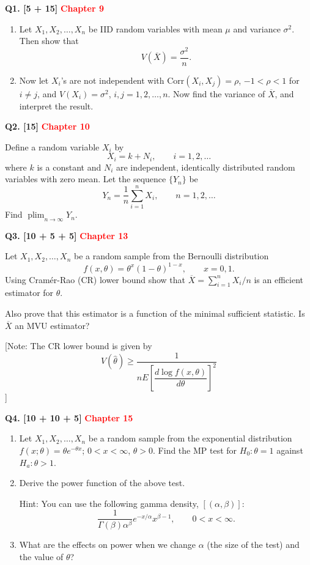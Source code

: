 \documentclass[11pt]{article}
\begin{document}
\medskip
\textbf{Q1. [5 + 15]}  \textbf{\textcolor{red}{Chapter 9}}
\begin{enumerate}
\setlength{\itemsep}{4pt}\setlength{\parsep}{0pt}\setlength{\topsep}{3pt}
\item[(a)] Let $X_1,X_2,\ldots,X_n$ be IID random variables with mean $\mu$ and variance $\sigma^2$. Then show that
\[
V(\overline{X})=\frac{\sigma^2}{n}.
\]
\item[(b)] Now let $X_i$'s are not independent with $\mathrm{Corr}(X_i,X_j)=\rho$, $-1<\rho<1$ for $i\neq j$, and $V(X_i)=\sigma^2$, $i,j=1,2,\ldots,n$. Now find the variance of $\overline{X}$, and interpret the result.
\end{enumerate}

\bigskip
\textbf{Q2. [15]}  \textbf{\textcolor{red}{Chapter 10}}

Define a random variable $X_i$ by
\[
X_i=k+N_i,\qquad i=1,2,\ldots
\]
where $k$ is a constant and $N_i$ are independent, identically distributed random variables with zero mean. Let the sequence $\{Y_n\}$ be
\[
Y_n=\frac{1}{n}\sum_{i=1}^n X_i,\qquad n=1,2,\ldots
\]
Find $\operatorname*{plim}_{n\to\infty}Y_n$.

\bigskip
\textbf{Q3. [10 + 5 + 5]}  \textbf{\textcolor{red}{Chapter 13}}

Let $X_1,X_2,\ldots,X_n$ be a random sample from the Bernoulli distribution
\[
f(x,\theta)=\theta^x(1-\theta)^{1-x},\qquad x=0,1.
\]
Using Cram\'er-Rao (CR) lower bound show that $\overline{X}=\sum_{i=1}^n X_i/n$ is an efficient estimator for $\theta$.

Also prove that this estimator is a function of the minimal sufficient statistic. Is $\overline{X}$ an MVU estimator?

[Note: The CR lower bound is given by
\[
V(\hat\theta)\geq\frac{1}{nE\left[\dfrac{d\log f(x,\theta)}{d\theta}\right]^2}
\]
]

\bigskip
\textbf{Q4. [10 + 10 + 5]}  \textbf{\textcolor{red}{Chapter 15}}
\begin{enumerate}
\setlength{\itemsep}{5pt}\setlength{\parsep}{0pt}\setlength{\topsep}{3pt}
\item[(a)] Let $X_1,X_2,\ldots,X_n$ be a random sample from the exponential distribution $f(x;\theta)=\theta e^{-\theta x}$; $0<x<\infty$, $\theta>0$. Find the MP test for $H_0:\theta=1$ against $H_a:\theta>1$.
\item[(b)] Derive the power function of the above test.

Hint: You can use the following gamma density, $[(\alpha,\beta)]$:
\[
\frac{1}{\Gamma(\beta)\alpha^\beta}e^{-x/\alpha}x^{\beta-1},
\qquad 0<x<\infty.
\]
\item[(c)] What are the effects on power when we change $\alpha$ (the size of the test) and the value of $\theta$?
\end{enumerate}
\end{document}
